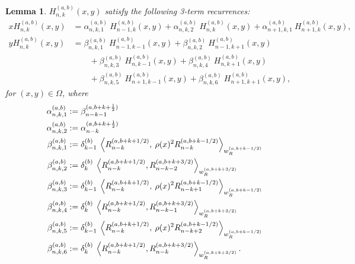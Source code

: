 \documentclass[11pt, oneside]{article}   	%
\newcommand{\half}{\frac{1}{2}}
\newcommand{\hdop}{H}
\newcommand{\hdopnk}{\hdop_{n,k}}
\newcommand{\alphaab}{\alpha^{(a,b)}}
\newcommand{\betaab}{\beta^{(a,b)}}
\newcommand{\genjac}{R}
\newcommand{\genjacnmk}{\genjac_{n-k}}
\newcommand{\genjacw}{w_\genjac}
\newtheorem{lemma}{Lemma}
\begin{document}
\begin{lemma}
$\hdopnk^{(a,b)}(x,y)$ satisfy the following 3-term recurrences:
\begin{align*}
x \hdopnk^{(a,b)}(x,y) &= \alphaab_{n,k,1} \: \hdop_{n-1, k}^{(a,b)}(x, y) + \alphaab_{n,k,2} \: \hdop_{n, k}^{(a,b)}(x, y) + \alphaab_{n+1,k,1} \: \hdop_{n+1, k}^{(a,b)}(x, y), \\
y \hdopnk^{(a,b)}(x,y) &= \betaab_{n,k,1} \: \hdop_{n-1, k-1}^{(a,b)}(x, y) + \betaab_{n,k,2} \: \hdop_{n-1, k+1}^{(a,b)}(x, y) \nonumber \\
		& \quad \quad + \betaab_{n,k,3} \: \hdop_{n, k-1}^{(a,b)}(x, y) + \betaab_{n,k,4} \: \hdop_{n, k+1}^{(a,b)}(x, y) \nonumber \\
		& \quad \quad + \betaab_{n,k,5} \: \hdop_{n+1, k-1}^{(a,b)}(x, y) + \betaab_{n,k,6} \: \hdop_{n+1, k+1}^{(a,b)}(x, y),
\end{align*}
for \((x,y) \in \Omega\), where
\begin{align*}
	\alphaab_{n,k,1} &:= \beta_{n-k-1}^{(a, b+k+\half)} \\
	\alphaab_{n,k,2} &:= \alpha_{n-k}^{(a, b+k+\half)} \\
	\betaab_{n,k,1} &:= \delta_{k-1}^{(b)} \: \ip<\genjacnmk^{(a, b+k+1/2)}, \: \rho(x)^2 \genjacnmk^{(a, b+k-1/2)}>_{\genjacw^{(a, b+k-1/2)}} \\
	\betaab_{n,k,2} &:= \delta_{k}^{(b)} \: \ip<\genjacnmk^{(a, b+k+1/2)}, \genjac_{n-k-2}^{(a, b+k+{3/2})}>_{\genjacw^{(a, b+k+{3/2})}} \\
	\betaab_{n,k,3} &:= \delta_{k-1}^{(b)} \: \ip<\genjacnmk^{(a, b+k+1/2)}, \: \rho(x)^2 \genjac_{n-k+1}^{(a, b+k-1/2)}>_{\genjacw^{(a, b+k-1/2)}} \\
	\betaab_{n,k,4} &:= \delta_{k}^{(b)} \: \ip<\genjacnmk^{(a, b+k+1/2)}, \genjac_{n-k-1}^{(a, b+k+{3/2})}>_{\genjacw^{(a, b+k+{3/2})}} \\
	\betaab_{n,k,5} &:= \delta_{k-1}^{(b)} \: \ip<\genjacnmk^{(a, b+k+1/2)}, \: \rho(x)^2 \genjac_{n-k+2}^{(a, b+k-1/2)}>_{\genjacw^{(a, b+k-1/2)}} \\
	\betaab_{n,k,6} &:= \delta_{k}^{(b)} \: \ip<\genjacnmk^{(a, b+k+1/2)}, \genjacnmk^{(a, b+k+{3/2})}>_{\genjacw^{(a, b+k+{3/2})}}. 
\end{align*}

\end{lemma}
\end{document}

